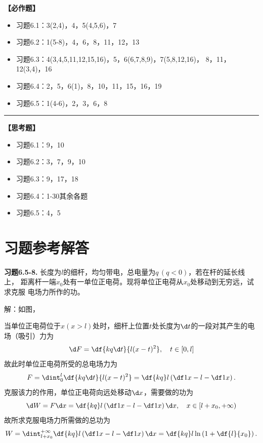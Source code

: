 {\bf 【必作题】}

\begin{itemize}
  \item 习题6.1：3(2,4)，4，5(4,5,6)，7
  \item 习题6.2：1(5-8)，4，6，8，11，12，13
  \item 习题6.3：4(3,4,5,11,12,15,16)，5，6(6,7,8,9)，7(5,8,12,16)，
  8，11，12(3,4)，16
  \item 习题6.4：2，5，6(1)，8，10，11，15，16，19
  \item 习题6.5：1(4-6)，2，3，6，8
\end{itemize}

\bigskip

\hrule

\bigskip
\bigskip

{\bf 【思考题】}

\begin{itemize}
  \item 习题6.1：9，10
  \item 习题6.2：3，7，9，10
  \item 习题6.3：9，17，18
  \item 习题6.4：1-30其余各题
  \item 习题6.5：4，5
\end{itemize}


\newpage

\section*{习题参考解答}

{\bf 习题6.5-8.} 长度为$l$的细杆，均匀带电，总电量为$q\,(q<0)$，若在杆的延长线上，
距离杆一端$x_0$处有一单位正电荷。现将单位正电荷从$x_0$处移动到无穷远，试求克服
电场力所作的功。

解：如图，
\begin{center}
\end{center}

当单位正电荷位于$x(x>l)$处时，细杆上位置$t$处长度为$\d t$的一段对其产生的电场（吸引）力为
$$\d F=\df{kq\d t}{l(x-t)^2},\quad t\in[0,l]$$
故此时单位正电荷所受的总电场力为
$$F=\dint_0^l\df{kq\d t}{l(x-t)^2}=\df{kq}l\left(\df1{x-l}-\df1x\right).$$
克服该力的作用，单位正电荷向远处移动$\d x$，需要做的功为
$$\d W=F\d x=\df{kq}l\left(\df1{x-l}-\df1x\right)\d x,
\quad x\in[l+x_0,+\infty)$$
故所求克服电场力所需做的总功为
$$W=\dint_{l+x_0}^{+\infty}\df{kq}l\left(\df1{x-l}-\df1x\right)\d x
=\df{kq}l\ln\left(1+\df{l}{x_0}\right).$$